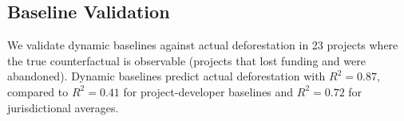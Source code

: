\subsection{Baseline Validation}

We validate dynamic baselines against actual deforestation in 23
projects where the true counterfactual is observable (projects that
lost funding and were abandoned). Dynamic baselines predict actual
deforestation with $R^2 = 0.87$, compared to $R^2 = 0.41$ for
project-developer baselines and $R^2 = 0.72$ for jurisdictional
averages.


